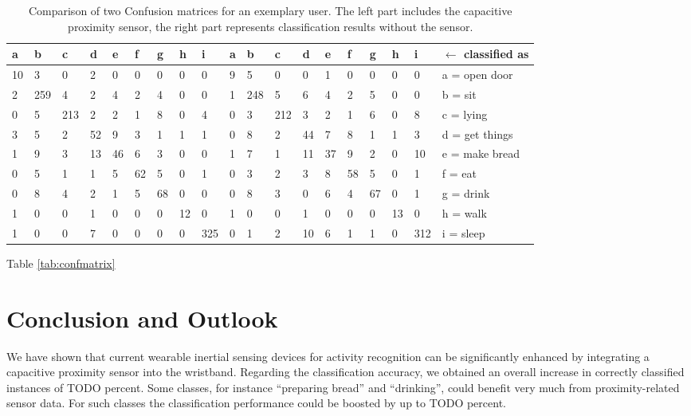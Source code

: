 \documentclass[runningheads,a4paper]{llncs}
\begin{document}
\begin{table}[htbp]
	\centering	\begin{tabular}{p{0.48cm}p{0.48cm}p{0.48cm}p{0.48cm}p{0.48cm}p{0.48cm}p{0.48cm}p{0.48cm}p{0.48cm}|p{0.48cm}p{0.48cm}p{0.48cm}p{0.48cm}p{0.48cm}p{0.48cm}p{0.48cm}p{0.48cm}p{0.48cm}|p{2.2cm}}
a & b & c & d & e & f & g & h & i & a & b & c & d & e & f & g & h & i & $\leftarrow$ classified as\\
\hline
10 & 3 & 0 & 2 & 0 & 0 & 0 & 0 & 0 		& 9 & 5 & 0 & 0 & 1 & 0 & 0 & 0 & 0 & a = open door\\
\hline
2 & 259 & 4 & 2 & 4 & 2 & 4 & 0 & 0 	& 1 & 248 & 5 & 6 & 4 & 2 & 5 & 0 & 0 & b = sit\\
\hline
0 & 5 & 213 & 2 & 2 & 1 & 8 & 0 & 4 	& 0 & 3 & 212 & 3 & 2 & 1 & 6 & 0 & 8 & c = lying\\
\hline
3 & 5 & 2 & 52 & 9 & 3 & 1 & 1 & 1 		& 0 & 8 & 2 & 44 & 7 & 8 & 1 & 1 & 3 & d = get things\\
\hline
1 & 9 & 3 & 13 & 46 & 6 & 3 & 0 & 0 	& 1 & 7 & 1 & 11 & 37 & 9 & 2 & 0 & 10 & e = make bread\\
\hline
0 & 5 & 1 & 1 & 5 & 62 & 5 & 0 & 1 		& 0 & 3 & 2 & 3 & 8 & 58 & 5 & 0 & 1 & f = eat\\
\hline
0 & 8 & 4 & 2 & 1 & 5 & 68 & 0 & 0 		& 0 & 8 & 3 & 0 & 6 & 4 & 67 & 0 & 1 & g = drink\\
\hline
1 & 0 & 0 & 1 & 0 & 0 & 0 & 12 & 0 		& 1 & 0 & 0 & 1 & 0 & 0 & 0 & 13 & 0 & h = walk\\
\hline
1 & 0 & 0 & 7 & 0 & 0 & 0 & 0 & 325 	& 0 & 1 & 2 & 10 & 6 & 1 & 1 & 0 & 312 & i = sleep\\
		\end{tabular}
	\caption{Comparison of two Confusion matrices for an exemplary user. The left part includes the capacitive proximity sensor, the right part represents classification results without the sensor.}
	\label{tab:ConfusionMatrixForAnExemplaryUser}
\end{table}

Table \ref{tab:confmatrix} 

\section{Conclusion and Outlook}

We have shown that current wearable inertial sensing devices for activity recognition can be significantly enhanced by integrating a capacitive proximity sensor into the wristband. Regarding the classification accuracy, we obtained an overall increase in correctly classified instances of TODO percent. Some classes, for instance ``preparing bread'' and ``drinking'', could benefit very much from proximity-related sensor data. For such classes the classification performance could be boosted by up to TODO percent. 
\end{document}
